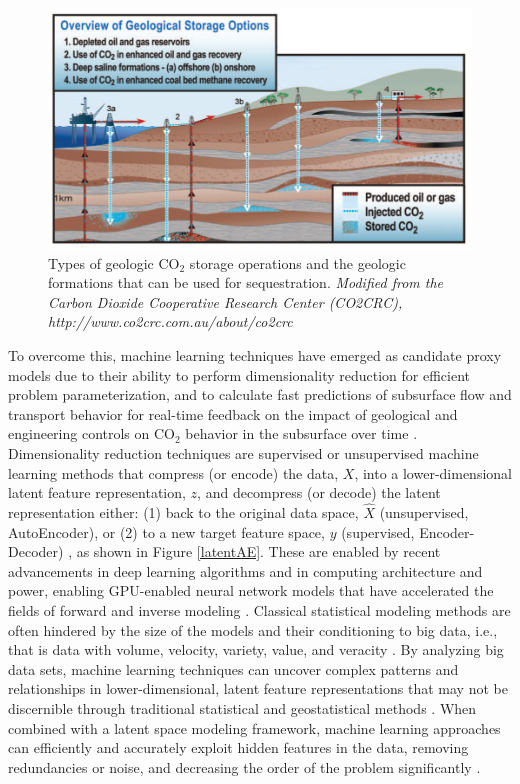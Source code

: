 \documentclass[10pt, twoside]{article}
\begin{document}
\begin{figure}
    \centering
    \includegraphics[width=16cm]{figures/co2types.png}
    \caption{Types of geologic CO$_2$ storage operations and the geologic formations that can be used for sequestration. \textit{Modified from the Carbon Dioxide Cooperative Research Center (CO2CRC), http://www.co2crc.com.au/about/co2crc}}
    \label{co2types}
\end{figure}

To overcome this, machine learning techniques have emerged as candidate proxy models due to their ability to perform dimensionality reduction for efficient problem parameterization, and to calculate fast predictions of subsurface flow and transport behavior for real-time feedback on the impact of geological and engineering controls on CO$_2$ behavior in the subsurface over time \cite{10.30632/SPWLA-2023-0084, Wu2021, Misra2022}. Dimensionality reduction techniques are supervised or unsupervised machine learning methods that compress (or encode) the data, $X$, into a lower-dimensional latent feature representation, $z$, and decompress (or decode) the latent representation either: (1) back to the original data space, $\hat{X}$ (unsupervised, AutoEncoder), or (2) to a new target feature space, $y$ (supervised, Encoder-Decoder) \cite{mabadeje2023rigid, Liu2022, Canchumuni201987}, as shown in Figure \ref{latentAE}. These are enabled by recent advancements in deep learning algorithms and in computing architecture and power, enabling GPU-enabled neural network models that have accelerated the fields of forward and inverse modeling \cite{Zhang20111631, Yan2022}. Classical statistical modeling methods are often hindered by the size of the models and their conditioning to big data, i.e., that is data with volume, velocity, variety, value, and veracity \cite{tariq2021systematic, MIRZA202227}. By analyzing big data sets, machine learning techniques can uncover complex patterns and relationships in lower-dimensional, latent feature representations that may not be discernible through traditional statistical and geostatistical methods \cite{Brunton2016SparseNLDynamics, FriesChoi2022LaSDI, HeChoi2023gLaSDI}. When combined with a latent space modeling framework, machine learning approaches can efficiently and accurately exploit hidden features in the data, removing redundancies or noise, and decreasing the order of the problem significantly \cite{Liu2020M15, Razak2022}. 
\end{document}
